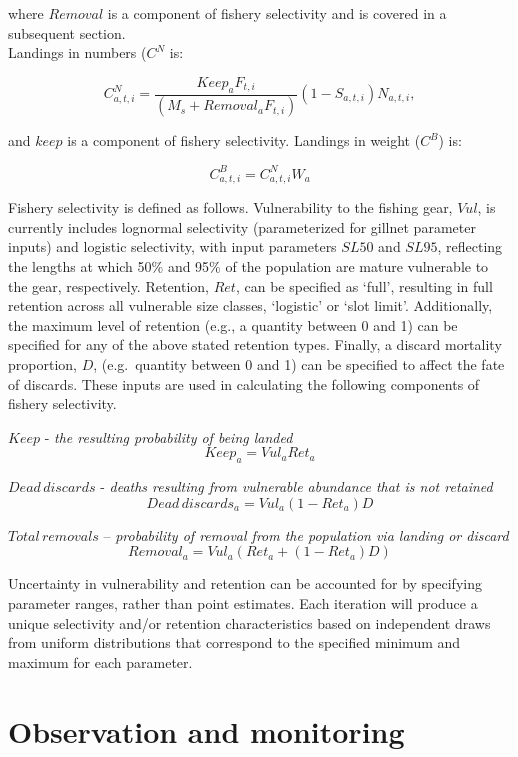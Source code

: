 \documentclass[
]{book}
\begin{document}
where \(Removal\) is a component of fishery selectivity and is covered in a subsequent section.\\
Landings in numbers (\(C^{N}\) is:

\[
C_{a,t,i}^N=\frac{{\mathit{Keep}}_aF_{t,i}}{\left(M_s+{\mathit{Removal}}_aF_{t,i}\right)}\left(1-S_{a,t,i}\right)N_{a,t,i}, \tag{eq. 14} \label{eq:fourteenth}
\]

and \(keep\) is a component of fishery selectivity. Landings in weight (\(C^B\)) is:

\[
C_{a,t,i}^B=C_{a,t,i}^NW_a \tag{eq. 15} \label{eq:fifteenth}
\]

Fishery selectivity is defined as follows. Vulnerability to the fishing gear, \(Vul\), is currently includes lognormal selectivity (parameterized for gillnet parameter inputs) and logistic selectivity, with input parameters \(SL50\) and \(SL95\), reflecting the lengths at which 50\% and 95\% of the population are mature vulnerable to the gear, respectively. Retention, \(Ret\), can be specified as `full', resulting in full retention across all vulnerable size classes, `logistic' or `slot limit'. Additionally, the maximum level of retention (e.g., a quantity between 0 and 1) can be specified for any of the above stated retention types. Finally, a discard mortality proportion, \(D\), (e.g.~quantity between 0 and 1) can be specified to affect the fate of discards. These inputs are used in calculating the following components of fishery selectivity.

\(Keep\) - \emph{the resulting probability of being landed}
\[
Keep_a=Vul_aRet_a \tag{eq. 16} \label{eq:sixteenth}
\]

\(Dead\,discards\) - \emph{deaths resulting from vulnerable abundance that is not retained}
\[
Dead\,discards_a=Vul_a(1-Ret_a)D \tag{eq. 17} \label{eq:seventeenth}
\]

\(Total\,removals\) -- \emph{probability of removal from the population via landing or discard}
\[
Removal_a=Vul_a(Ret_a+(1-Ret_a)D) \tag{eq. 18} \label{eq:eighteenth}
\]

Uncertainty in vulnerability and retention can be accounted for by specifying parameter ranges, rather than point estimates. Each iteration will produce a unique selectivity and/or retention characteristics based on independent draws from uniform distributions that correspond to the specified minimum and maximum for each parameter.

\section{Observation and monitoring}\label{observation-and-monitoring}
\end{document}
